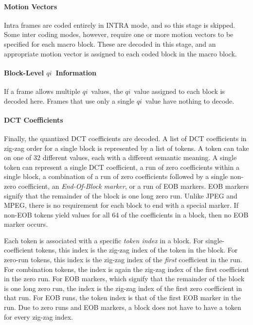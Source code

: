 \documentclass[9pt,letterpaper]{book}
\newcommand{\idx}[1]{{\ensuremath{\mathit{#1}}}}
\newcommand{\qi}{\idx{qi}}
\newcommand{\term}[1]{{\em #1}}
\numberwithin{equation}{chapter}
\numberwithin{figure}{chapter}
\numberwithin{table}{chapter}
\begin{document}
\paragraph{Motion Vectors}

Intra frames are coded entirely in INTRA mode, and so this stage is skipped.
Some inter coding modes, however, require one or more motion vectors to be
 specified for each macro block.
These are decoded in this stage, and an appropriate motion vector is assigned
 to each coded block in the macro block.

\paragraph{Block-Level \qi\ Information}

If a frame allows multiple \qi\ values, the \qi\ value assigned to each block
 is decoded here.
Frames that use only a single \qi\ value have nothing to decode.

\paragraph{DCT Coefficients}

Finally, the quantized DCT coefficients are decoded.
A list of DCT coefficients in zig-zag order for a single block is represented
 by a list of tokens.
A token can take on one of 32 different values, each with a different semantic
 meaning.
A single token can represent a single DCT coefficient, a run of zero
 coefficients within a single block, a combination of a run of zero
 coefficients followed by a single non-zero coefficient, an
 \term{End-Of-Block marker}, or a run of EOB markers.
EOB markers signify that the remainder of the block is one long zero run.
Unlike JPEG and MPEG, there is no requirement for each block to end with 
 a special marker.
If non-EOB tokens yield values for all 64 of the coefficients in a block, then
 no EOB marker occurs.

Each token is associated with a specific \term{token index} in a block.
For single-coefficient tokens, this index is the zig-zag index of the token in
 the block.
For zero-run tokens, this index is the zig-zag index of the {\em first}
 coefficient in the run.
For combination tokens, the index is again the zig-zag index of the first
 coefficient in the zero run.
For EOB markers, which signify that the remainder of the block is one long zero
 run, the index is the zig-zag index of the first zero coefficient in that run.
For EOB runs, the token index is that of the first EOB marker in the run.
Due to zero runs and EOB markers, a block does not have to have a token for
 every zig-zag index.
\end{document}
